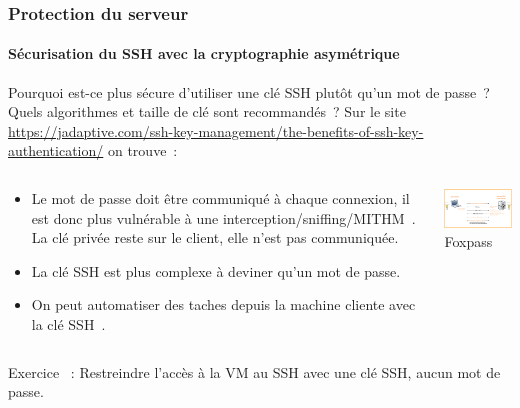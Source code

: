 \documentclass{beamer}
\begin{document}
    \begin{frame}
        \frametitle{Protection du serveur}
        \framesubtitle{Sécurisation du SSH avec la cryptographie asymétrique}
        \transdissolve
        \begin{footnotesize}
            Pourquoi est-ce plus sécure d'utiliser une clé SSH plutôt qu'un mot de passe~?
            \bigbreak
            Quels algorithmes et taille de clé sont recommandés~?
            \pause
            \bigbreak
            Sur le site \url{https://jadaptive.com/ssh-key-management/the-benefits-of-ssh-key-authentication/} on trouve~:
            \begin{columns}
                \begin{column}{0.6\textwidth}
                    \begin{itemize}
                        \item Le mot de passe doit être communiqué à chaque connexion, il est donc plus vulnérable à une interception/sniffing/MITHM~.
                        La clé privée reste sur le client, elle n'est pas communiquée.
                        \item La clé SSH est plus complexe à deviner qu'un mot de passe.
                        \item On peut automatiser des taches depuis la machine cliente avec la clé SSH~.
                    \end{itemize}
                \end{column}
                \begin{column}{0.4\textwidth}
                    \centering
                    \includegraphics[width=5cm]{image/ssh-key-diagram} \\ Foxpass\footnotemark \\
                \end{column}
            \end{columns}
            \flushleft
            Exercice \execcounterdispinc{}~:
            Restreindre l'accès à la VM au SSH avec une clé SSH, aucun mot de passe.
        \end{footnotesize}
    \end{frame}
\end{document}
